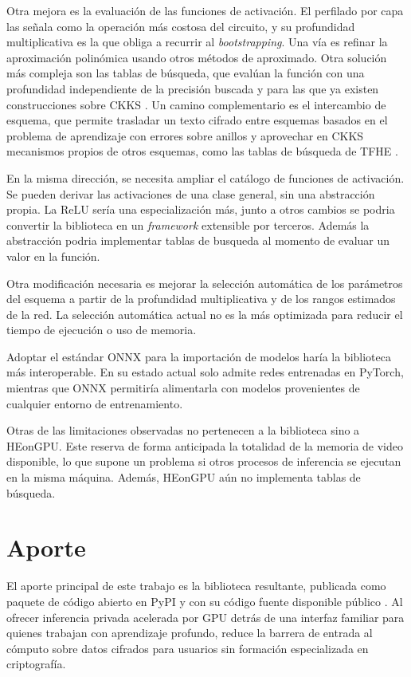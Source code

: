 Otra mejora es la evaluación de las funciones de activación. El perfilado por capa las señala como la operación más costosa del circuito, y su profundidad multiplicativa es la que obliga a recurrir al \textit{bootstrapping}. Una vía es refinar la aproximación polinómica usando otros métodos de aproximado. Otra solución más compleja son las tablas de búsqueda, que evalúan la función con una profundidad independiente de la precisión buscada y para las que ya existen construcciones sobre CKKS \cite{ZhuCKKSLUT2025}. Un camino complementario es el intercambio de esquema, que permite trasladar un texto cifrado entre esquemas basados en el problema de aprendizaje con errores sobre anillos y aprovechar en CKKS mecanismos propios de otros esquemas, como las tablas de búsqueda de TFHE \cite{Chimera2020}.

En la misma dirección, se necesita ampliar el catálogo de funciones de activación. Se pueden derivar las activaciones de una clase general, sin una abstracción propia. La ReLU sería una especialización más, junto a otros cambios se podria convertir la biblioteca en un \textit{framework} extensible por terceros. Además la abstracción podria implementar tablas de busqueda al momento de evaluar un valor en la función.

Otra modificación necesaria es mejorar la selección automática de los parámetros del esquema a partir de la profundidad multiplicativa y de los rangos estimados de la red. La selección automática actual no es la más optimizada para reducir el tiempo de ejecución o uso de memoria.

Adoptar el estándar ONNX para la importación de modelos haría la biblioteca más interoperable. En su estado actual solo admite redes entrenadas en PyTorch, mientras que ONNX permitiría alimentarla con modelos provenientes de cualquier entorno de entrenamiento.

Otras de las limitaciones observadas no pertenecen a la biblioteca sino a HEonGPU. Este reserva de forma anticipada la totalidad de la memoria de video disponible, lo que supone un problema si otros procesos de inferencia se ejecutan en la misma máquina. Además, HEonGPU aún no implementa tablas de búsqueda. 

\section*{Aporte}

El aporte principal de este trabajo es la biblioteca resultante, publicada como paquete de código abierto en PyPI \cite{OpalPyPI} y con su código fuente disponible público \cite{SDKRepo}. Al ofrecer inferencia privada acelerada por GPU detrás de una interfaz familiar para quienes trabajan con aprendizaje profundo, reduce la barrera de entrada al cómputo sobre datos cifrados para usuarios sin formación especializada en criptografía. 
